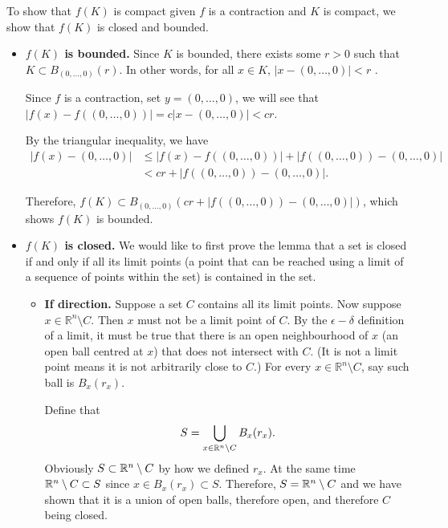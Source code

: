 To show that \(f(K)\) is compact given \(f\) is a contraction and \(K\) is compact, we show that \(f(K)\) is closed and bounded.

\begin{itemize}
    \item \textbf{\(f(K)\) is bounded.} Since \(K\) is bounded, there exists some \(r > 0\) such that \(K \subset B_{(0, \ldots, 0)} (r)\). In other words, for all \(x \in K\), \(|x - (0, \ldots, 0)| < r\) .
        
    Since \(f\) is a contraction, set \(y = (0, \ldots, 0)\), we will see that \(|f(x) - f((0, \ldots, 0))| = c|x - (0, \ldots, 0)| < cr\).
    
    By the triangular inequality, we have
    \begin{align*}
        |f(x) - (0, \ldots, 0)| &\leq |f(x) - f((0, \ldots, 0))| + |f((0, \ldots, 0)) - (0, \ldots, 0)|\\
        &< cr + |f((0, \ldots, 0)) - (0, \ldots, 0)|.
    \end{align*}
    
    Therefore, \(f(K) \subset B_{(0, \ldots, 0)} (cr + |f((0, \ldots, 0)) - (0, \ldots, 0)|)\), which shows \(f(K)\) is bounded.
        
    \item \textbf{\(f(K)\) is closed.} We would like to first prove the lemma that a set is closed if and only if all its limit points (a point that can be reached using a limit of a sequence of points within the set) is contained in the set.
    \begin{itemize}
        \item \textbf{If direction.} Suppose a set \(C\) contains all its limit points. Now suppose \(x \in \mathbb{R}^n \setminus C\). Then \(x\) must not be a limit point of \(C\). By the \(\epsilon-\delta\) definition of a limit, it must be true that there is an open neighbourhood of \(x\) (an open ball centred at \(x\)) that does not intersect with \(C\). (It is not a limit point means it is not arbitrarily close to \(C\).) For every \(x \in \mathbb{R}^n \setminus C\), say such ball is \(B_x(r_x)\).

        Define that
        \[
            S = \bigcup_{x \in \mathbb{R}^n \setminus C} B_x (r_x).
        \]
        Obviously \(S \subset \mathbb{R}^n \setminus C\) by how we defined \(r_x\). At the same time \(\mathbb{R}^n\setminus C \subset S\) since \(x \in B_x(r_x) \subset S\). Therefore, \(S = \mathbb{R}^n \setminus C\) and we have shown that it is a union of open balls, therefore open, and therefore \(C\) being closed.
        

\end{itemize}
\end{itemize}

